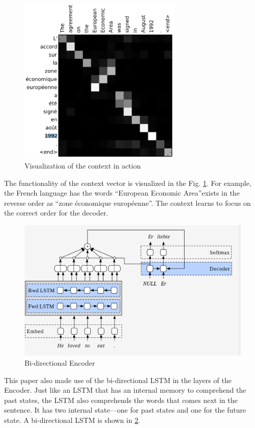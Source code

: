 \documentclass[conference]{IEEEtran}
\begin{document}
 \begin{figure}
    \includegraphics[height=8cm]{img/contextres.png}  
    \caption{Visualization of the context in action}
    \label{fig:contextvis}
  \end{figure}
  

The functionality of the context vector is visualized in the Fig. \ref{fig:contextvis}. For example, the French language has the words  \textquotedblleft European Economic Area\textquotedblright exists in the reverse order as \textquotedblleft zone \'{e}conomique europ\'{e}enne\textquotedblright. The context learns to focus on the correct order for the decoder. 



\begin{figure}
    \includegraphics[width=0.9\linewidth]{img/birnn.png}  
    \caption{Bi-directional Encoder}
    \label{fig:birnn}
\end{figure}

This paper also made use of the bi-directional LSTM in the layers of the Encoder. Just like an LSTM that has an internal memory to comprehend the past states, the LSTM also comprehends the words that comes next in the sentence. It has two internal state---one for past states and one for the future state. A bi-directional LSTM is shown in \ref{fig:birnn}.
\end{document}
